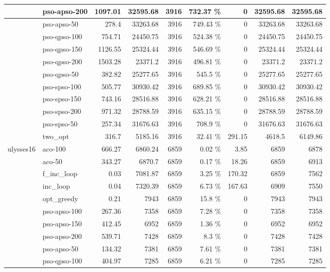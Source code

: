 \documentclass[conference]{IEEEtran}
\begin{document}
\begin{center}
\begin{longtable}[ht]{|l|l|r|r|r|r|r|r|r|}
 & pso-apso-200 & 1097.01 & 32595.68 & 3916 & 732.37 \% & 0 & 32595.68 & 32595.68 \\ \hline
 & pso-apso-50 & 278.4 & 33263.68 & 3916 & 749.43 \% & 0 & 33263.68 & 33263.68 \\ \hline
 & pso-qpso-100 & 754.71 & 24450.75 & 3916 & 524.38 \% & 0 & 24450.75 & 24450.75 \\ \hline
 & pso-qpso-150 & 1126.55 & 25324.44 & 3916 & 546.69 \% & 0 & 25324.44 & 25324.44 \\ \hline
 & pso-qpso-200 & 1503.28 & 23371.2 & 3916 & 496.81 \% & 0 & 23371.2 & 23371.2 \\ \hline
 & pso-qpso-50 & 382.82 & 25277.65 & 3916 & 545.5 \% & 0 & 25277.65 & 25277.65 \\ \hline
 & pso-spso-100 & 505.77 & 30930.42 & 3916 & 689.85 \% & 0 & 30930.42 & 30930.42 \\ \hline
 & pso-spso-150 & 743.16 & 28516.88 & 3916 & 628.21 \% & 0 & 28516.88 & 28516.88 \\ \hline
 & pso-spso-200 & 971.32 & 28788.59 & 3916 & 635.15 \% & 0 & 28788.59 & 28788.59 \\ \hline
 & pso-spso-50 & 257.34 & 31676.63 & 3916 & 708.9 \% & 0 & 31676.63 & 31676.63 \\ \hline
 & two\_opt & 316.7 & 5185.16 & 3916 & 32.41 \% & 291.15 & 4618.5 & 6149.86 \\ \hline
ulysses16 & aco-100 & 666.27 & 6860.24 & 6859 & 0.02 \% & 3.85 & 6859 & 6878 \\ \hline
 & aco-50 & 343.27 & 6870.7 & 6859 & 0.17 \% & 18.26 & 6859 & 6913 \\ \hline
 & f\_inc\_loop & 0.03 & 7081.87 & 6859 & 3.25 \% & 170.32 & 6859 & 7562 \\ \hline
 & inc\_loop & 0.04 & 7320.39 & 6859 & 6.73 \% & 167.63 & 6909 & 7550 \\ \hline
 & opt\_greedy & 0.21 & 7943 & 6859 & 15.8 \% & 0 & 7943 & 7943 \\ \hline
 & pso-apso-100 & 267.36 & 7358 & 6859 & 7.28 \% & 0 & 7358 & 7358 \\ \hline
 & pso-apso-150 & 412.45 & 6952 & 6859 & 1.36 \% & 0 & 6952 & 6952 \\ \hline
 & pso-apso-200 & 539.71 & 7428 & 6859 & 8.3 \% & 0 & 7428 & 7428 \\ \hline
 & pso-apso-50 & 134.32 & 7381 & 6859 & 7.61 \% & 0 & 7381 & 7381 \\ \hline
 & pso-qpso-100 & 404.97 & 7285 & 6859 & 6.21 \% & 0 & 7285 & 7285 \\ \hline

\end{longtable}
\end{center}
\end{document}
